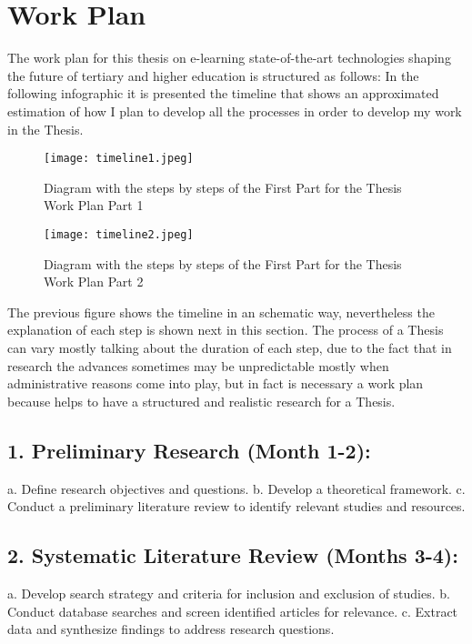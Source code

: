 \section{Work Plan}

The work plan for this thesis on e-learning state-of-the-art technologies shaping the future of tertiary and higher education is structured as follows: In the following infographic it is presented the timeline that shows an approximated estimation of how I plan to develop all the processes in order to develop my work in the Thesis.



\begin{figure}[H]
    \centering
    \texttt{[image: timeline1.jpeg]}
    \caption{Diagram with the steps by steps of the First Part for the Thesis Work Plan Part 1}
    \label{fig:my_label}
\end{figure}



\begin{figure}[H]
    \centering
    \texttt{[image: timeline2.jpeg]}
    \caption{Diagram with the steps by steps of the First Part for the Thesis Work Plan Part 2}
    \label{fig:my_label}
\end{figure}






The previous figure shows the timeline in an schematic way, nevertheless the explanation of each step is shown next in this section. The process of a Thesis can vary mostly talking about the duration of each step, due to the fact that in research the advances sometimes may be unpredictable mostly when administrative reasons come into play, but in fact is necessary a work plan because helps to have a structured and realistic research for a Thesis.



\subsection{1. Preliminary Research (Month 1-2):}
   a. Define research objectives and questions.
   b. Develop a theoretical framework.
   c. Conduct a preliminary literature review to identify relevant studies and resources.

\subsection{2. Systematic Literature Review (Months 3-4):}
   a. Develop search strategy and criteria for inclusion and exclusion of studies.
   b. Conduct database searches and screen identified articles for relevance.
   c. Extract data and synthesize findings to address research questions.

